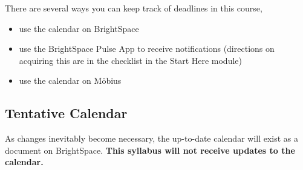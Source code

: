 \documentclass[letterpaper,twoside]{article}
\def\Mobius{M\"obius\ }
\newcommand\CalendarCell[1]{\footnotesize\textsc{#1}}
\newcommand\CalendarItemSection[2]{\textbf{#1} #2}
\newcommand\CalendarItemAssignment[1]{\color{DeepGold}{#1}}
\newenvironment{SorrellItemize}
{
    \setlength\parskip{-5pt}
    \begin{itemize}[leftmargin=11pt]
        \setlength\itemsep{-4pt}
}{
    \end{itemize}
}
\begin{document}
There are several ways you can keep track of deadlines in this course,
\begin{SorrellItemize}
    \item use the calendar on BrightSpace
    \item use the BrightSpace Pulse App to receive notifications (directions on acquiring this are in the checklist in the Start Here module)
    \item use the calendar on \Mobius
\end{SorrellItemize}

\newpage
\subsection*{Tentative Calendar}

As changes inevitably become necessary, the up-to-date calendar will exist as a document on BrightSpace.
\textbf{This syllabus will not receive updates to the calendar.}
\end{document}

